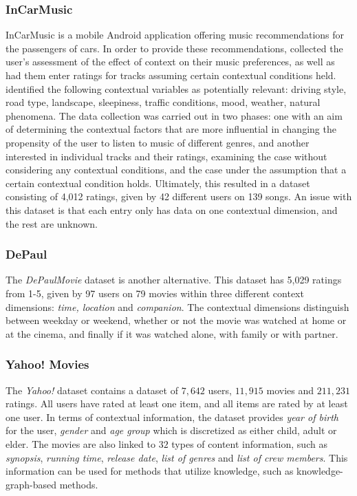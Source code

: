 \subsubsection{InCarMusic}
InCarMusic is a mobile Android application offering music recommendations for the passengers of cars.
In order to provide these recommendations, \cite{InCarMusic2011} collected the user's assessment of the effect of context on their music preferences, as well as had them enter ratings for tracks assuming certain contextual conditions held.
\cite{InCarMusic2011} identified the following contextual variables as potentially relevant: driving style, road type, landscape, sleepiness, traffic conditions, mood, weather, natural phenomena.
The data collection was carried out in two phases: one with an aim of determining the contextual factors that are more influential in changing the propensity of the user to listen to music of different genres, and another interested in individual tracks and their ratings, examining the case without considering any contextual conditions, and the case under the assumption that a certain contextual condition holds.
Ultimately, this resulted in a dataset consisting of 4,012 ratings, given by 42 different users on 139 songs.
An issue with this dataset is that each entry only has data on one contextual dimension, and the rest are unknown.

\subsubsection{DePaul}
The \textit{DePaulMovie} dataset is another alternative.
This dataset has 5,029 ratings from 1-5, given by 97 users on 79 movies within three different context dimensions: \textit{time, location} and \textit{companion}\cite{DePaulData}.
The contextual dimensions distinguish between weekday or weekend, whether or not the movie was watched at home or at the cinema, and finally if it was watched alone, with family or with partner.

\subsubsection{Yahoo! Movies}
The \textit{Yahoo!} dataset contains a dataset of $7,642$ users, $11,915$ movies and $211,231$ ratings.
All users have rated at least one item, and all items are rated by at least one user.
In terms of contextual information, the dataset provides \textit{year of birth} for the user, \textit{gender} and \textit{age group} which is discretized as either child, adult or elder.
The movies are also linked to $32$ types of content information, such as \textit{synopsis}, \textit{running time}, \textit{release date}, \textit{list of genres} and \textit{list of crew members}.
This information can be used for methods that utilize knowledge, such as knowledge-graph-based methods.

